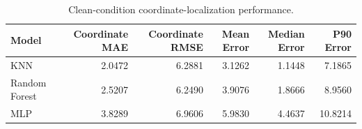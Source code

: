 \begin{table}
\caption{Clean-condition coordinate-localization performance.}
\label{tab:localization_baselines}
\begin{tabular}{lrrrrr}
\toprule
Model & Coordinate MAE & Coordinate RMSE & Mean Error & Median Error & P90 Error \\
\midrule
KNN & 2.0472 & 6.2881 & 3.1262 & 1.1448 & 7.1865 \\
Random Forest & 2.5207 & 6.2490 & 3.9076 & 1.8666 & 8.9560 \\
MLP & 3.8289 & 6.9606 & 5.9830 & 4.4637 & 10.8214 \\
\bottomrule
\end{tabular}
\end{table}
